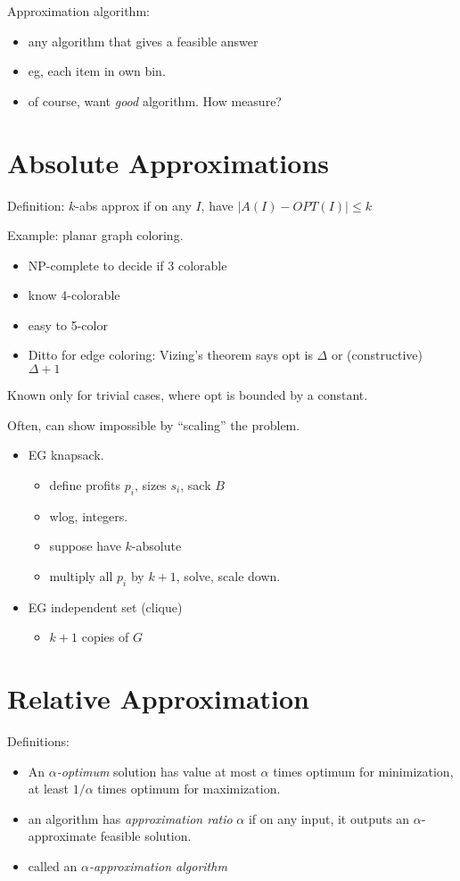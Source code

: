 \documentclass{article}
\begin{document}
Approximation algorithm:
\begin{itemize}
\item any algorithm that gives a feasible answer
\item eg, each item in own bin.
\item of course, want \emph{good} algorithm.  How measure?
\end{itemize}

\section*{Absolute Approximations}

Definition: $k$-abs approx if on any $I$, have $|A(I)-OPT(I)| \le k$

Example: planar graph coloring.
\begin{itemize}
\item NP-complete to decide if 3 colorable
\item know 4-colorable
\item easy to 5-color
\item Ditto for edge coloring: Vizing's theorem says opt is $\Delta$
  or (constructive) $\Delta+1$
\end{itemize}
Known only for trivial cases, where opt is bounded by a constant.

Often, can show impossible by ``scaling'' the problem.
\begin{itemize}
\item 
EG knapsack.
\begin{itemize}
\item define profits $p_i$, sizes $s_i$, sack $B$
\item wlog, integers.
\item suppose have $k$-absolute
\item multiply all $p_i$ by $k+1$, solve, scale down.
\end{itemize}
\item 
EG independent set (clique)
\begin{itemize}
\item $k+1$ copies of $G$
\end{itemize}
\end{itemize}

\section*{Relative Approximation}

Definitions:
\begin{itemize}
\item 
An \emph{$\alpha$-optimum} solution has value at most $\alpha$ times
optimum for minimization, at least $1/\alpha$ times optimum for
maximization.  
\item an algorithm has \emph{approximation ratio} $\alpha$ if on any
  input, it outputs an $\alpha$-approximate feasible solution.
\item called an \emph{$\alpha$-approximation algorithm}
\end{itemize}
\end{document}
